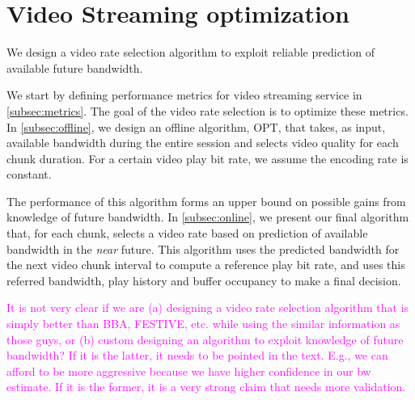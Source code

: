 \newcommand{\rks}[1]{\textcolor{magenta}{#1}}
\section{Video Streaming optimization}\label{sec:optimization}

We design a video rate selection algorithm to exploit reliable
prediction of available future bandwidth.


We start by defining performance metrics for video streaming service in
\autoref{subsec:metrics}. The goal of the video rate selection is to 
optimize these metrics.
In \autoref{subsec:offline}, we design an offline algorithm, OPT, that
takes, as input, available bandwidth during the entire session and
selects video quality for each chunk duration. For a certain video play bit rate, we assume the encoding rate is
constant.

  
The performance of this algorithm forms an upper bound on possible
gains from knowledge of future bandwidth.
In \autoref{subsec:online}, we present our final algorithm that, for
each chunk, selects a video rate  based on prediction of 
available bandwidth in the \emph{near} future. This algorithm uses the predicted bandwidth 
for the next video chunk interval to compute a reference play bit rate, and uses this referred bandwidth, 
play history and buffer occupancy to make a final decision. 

\rks{It is not very clear if we are (a) designing a video rate
  selection algorithm that is simply better than BBA, FESTIVE,
  etc. while using the similar information as those guys,
  or (b) custom designing an algorithm to exploit knowledge of future
  bandwidth? If it is the latter, it needs to be pointed in the
  text. E.g., we can afford to be more aggressive because we have
  higher confidence in our bw estimate. If it is the former, it is a
  very strong claim that needs more validation.}


